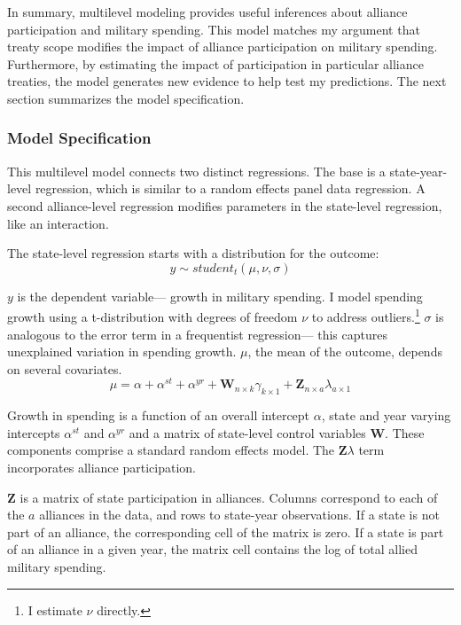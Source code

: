 \documentclass[12pt]{article}
\begin{document}
In summary, multilevel modeling provides useful inferences about alliance participation and military spending. 
This model matches my argument that treaty scope modifies the impact of alliance participation on military spending. 
Furthermore, by estimating the impact of participation in particular alliance treaties, the model generates new evidence to help test my predictions. 
The next section summarizes the model specification. 
 


\subsubsection{Model Specification} 

This multilevel model connects two distinct regressions. 
The base is a state-year-level regression, which is similar to a random effects panel data regression.
A second alliance-level regression modifies parameters in the state-level regression, like an interaction. 


The state-level regression starts with a distribution for the outcome:
\begin{equation}
y \sim student_t(\mu, \nu, \sigma)
\end{equation}
 

$y$ is the dependent variable--- growth in military spending. 
I model spending growth using a t-distribution with degrees of freedom $\nu$ to address outliers.\footnote{I estimate $\nu$ directly.}
$\sigma$ is analogous to the error term in a frequentist regression--- this captures unexplained variation in spending growth.  
$\mu$, the mean of the outcome, depends on several covariates.
\begin{equation}
\mu = \alpha + \alpha^{st} + \alpha^{yr} +\textbf{W}_{n \times k} \gamma_{k \times 1}  + \textbf{Z}_{n \times a} \lambda_{a \times 1} 
\end{equation}


Growth in spending is a function of an overall intercept $\alpha$, state and year varying intercepts $\alpha^{st}$ and $\alpha^{yr}$ and a matrix of state-level control variables $\textbf{W}$.
These components comprise a standard random effects model. 
The $\textbf{Z} \lambda$ term incorporates alliance participation.


$\textbf{Z}$ is a matrix of state participation in alliances. 
Columns correspond to each of the $a$ alliances in the data, and rows to state-year observations. 
If a state is not part of an alliance, the corresponding cell of the matrix is zero.
If a state is part of an alliance in a given year, the matrix cell contains the log of total allied military spending.
\end{document}
